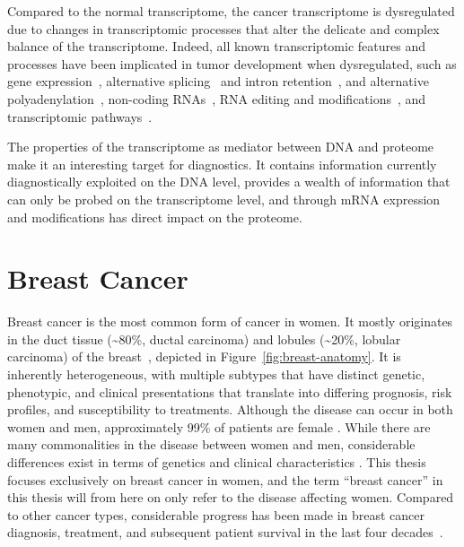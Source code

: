 \documentclass[11pt]{book}
\begin{document}
Compared to the normal transcriptome, the cancer transcriptome is dysregulated due to changes in transcriptomic processes that alter the delicate and complex balance of the transcriptome. Indeed, all known transcriptomic features and processes have been implicated in tumor development when dysregulated, such as gene expression~\cite{Perou:2000, Ross:2000}, alternative splicing~\cite{Kahraman:2020, CherryLynch:2020, Bonnal:2020} and intron retention~\cite{Monteuuis:2020}, and alternative polyadenylation~\cite{Erson-BensanCan:2016}, non-coding RNAs~\cite{SlackChinnaiyan:2019, Rheinbay:2020, Liu:2020}, RNA editing and modifications~\cite{Eisenberg:2018-A-to-I, BarbieriKouzarides:2020, DongCui:2020}, and transcriptomic pathways~\cite{PoppMaquat:2018, Lindeboom:2019}.

The properties of the transcriptome as mediator between DNA and proteome make it an interesting target for diagnostics. It contains information currently diagnostically exploited on the DNA level, provides a wealth of information that can only be probed on the transcriptome level, and through mRNA expression and modifications has direct impact on the proteome.


%
%
\section{Breast Cancer}

Breast cancer is the most common form of cancer in women. It mostly originates in the duct tissue (\textasciitilde80\%, ductal carcinoma) and lobules (\textasciitilde20\%, lobular carcinoma) of the breast~\cite{Harbeck:2019}, depicted in Figure~\ref{fig:breast-anatomy}. It is inherently heterogeneous, with multiple subtypes that have distinct genetic, phenotypic, and clinical presentations that translate into differing prognosis, risk profiles, and susceptibility to treatments. Although the disease can occur in both women and men, approximately 99\% of patients are female \cite{Ferzoco:2016}. While there are many commonalities in the disease between women and men, considerable differences exist in terms of genetics and clinical characteristics \cite{Nilsson:2011, Johansson:2011, Johansson:2013}. This thesis focuses exclusively on breast cancer in women, and the term ``breast cancer'' in this thesis will from here on only refer to the disease affecting women. Compared to other cancer types, considerable progress has been made in breast cancer diagnosis, treatment, and subsequent patient survival in the last four decades~\cite{Hortobagyi:2020}.
\end{document}
